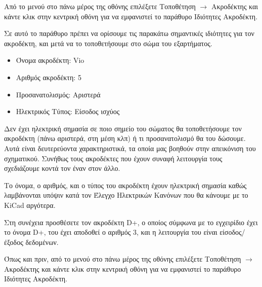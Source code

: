 \documentclass[a4paper]{article}
\begin{document}
Από το μενού στο πάνω μέρος της οθόνης επιλέξετε Τοποθέτηση $\rightarrow$ Ακροδέκτης και κάντε κλικ στην κεντρική οθόνη για να εμφανιστεί το παράθυρο Ιδιότητες Ακροδέκτη.

\begin{figure}
  \begin{center}
    \label{fig:kicad-main}
  \end{center}
\end{figure}

Σε αυτό το παράθυρο πρέπει να ορίσουμε τις παρακάτω σημαντικές ιδιότητες για τον ακροδέκτη, και μετά να το τοποθετήσουμε στο σώμα του εξαρτήματος.

\begin{itemize}
    \item Όνομα ακροδέκτη: Vio
    \item Αριθμός ακροδέκτη: 5
    \item Προσανατολισμός: Αριστερά
    \item Ηλεκτρικός Τύπος: Είσοδος ισχύος
\end{itemize}

Δεν έχει ηλεκτρική σημασία σε ποιο σημείο του σώματος θα τοποθετήσουμε τον ακροδέκτη (πάνω αριστερά, στη μέση κλπ) ή τι προσανατολισμό θα του δώσουμε. Αυτά είναι δευτερεύοντα χαρακτηριστικά, τα οποία μας βοηθούν στην απεικόνιση του σχηματικού. Συνήθως τους ακροδέκτες που έχουν συναφή λειτουργία τους σχεδιάζουμε κοντά τον έναν στον άλλο.

Το όνομα, ο αριθμός, και ο τύπος του ακροδέκτη έχουν ηλεκτρική σημασία καθώς λαμβάνονται υπόψιν κατά τον Έλεγχο Ηλεκτρικών Κανόνων που θα κάνουμε με το \textenglish{KiCad} αργότερα.

\begin{figure}
  \begin{center}
    \label{fig:kicad-main}
  \end{center}
\end{figure}

Στη συνέχεια προσθέσετε τον ακροδέκτη D+, ο οποίος σύμφωνα με το εγχειρίδιο έχει το όνομα D+, του έχει αποδοθεί ο αριθμός 3, και η λειτουργία του είναι είσοδος/έξοδος δεδομένων.

Όπως και πριν, από το μενού στο πάνω μέρος της οθόνης επιλέξετε Τοποθέτηση $\rightarrow$ Ακροδέκτης και κάντε κλικ στην κεντρική οθόνη για να εμφανιστεί το παράθυρο Ιδιότητες Ακροδέκτη.
\end{document}
